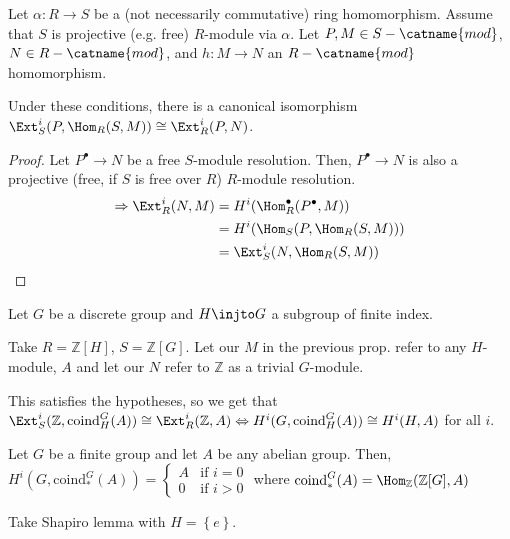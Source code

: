 \documentclass[12pt]{scrartcl}
\begin{document}
\begin{proposition}
Let $\alpha: R \to S$ be a (not necessarily commutative) ring homomorphism.
Assume that $S$ is projective (e.g. free) $R$-module via $\alpha$.
Let $P, M \in S-\catname{mod}$, $N \in R-\catname{mod}$, and $h: M \to N$ an $R-\catname{mod}$ homomorphism.

Under these conditions, there is a canonical isomorphism $\Ext_S^i(P, \Hom_R(S, M)) \cong \Ext_R^i(P, N)$. 
\end{proposition}

\begin{proof}
Let $P^{\bullet} \to N$  be a free $S$-module resolution.
Then, $P^{\bullet} \to N$ is also a projective (free, if $S$ is free over $R$) $R$-module resolution.
\begin{align*}
\Rightarrow \Ext_R^i(N, M) &= H^i(\Hom^{\bullet}_R(P^{\bullet}, M)) \\
 &= H^i(\Hom_S(P, \Hom_R(S, M))) \\
&= \Ext_S^i(N, \Hom_R(S, M)) \\
\end{align*}
\end{proof}

\begin{corollary}
Let $G$ be a discrete group and $H \injto G$  a subgroup of finite index.

Take $R = \mathbb{Z}[H]$, $S= \mathbb{Z}[G]$.
Let our $M$ in the previous prop. refer to any $H$-module, $A$ and let our $N$ refer to $\mathbb{Z}$ as a trivial $G$-module.
\end{corollary}
This satisfies the hypotheses, so we get that $\Ext_S^i(\mathbb{Z}, \textrm{coind}_H^G(A)) \cong \Ext_R^i(\mathbb{Z}, A) \Leftrightarrow H^i(G, \textrm{coind}_H^G(A)) \cong H^i(H, A)$ for all $i$. 

\begin{corollary}
Let $G$ be a finite group and let $A$ be any abelian group.
Then, $H^i(G, \textrm{coind}_{*}^G(A)) = \begin{cases} A & \text{if } i=0 \\ 0 & \text{if } i>0\end{cases}$ where $\textrm{coind}_{*}^{G}(A) = \Hom_{\mathbb{Z}}(\mathbb{Z}[G], A)$ 
\end{corollary}

Take Shapiro lemma with $H = \left\{e\right\}$.
\end{document}
